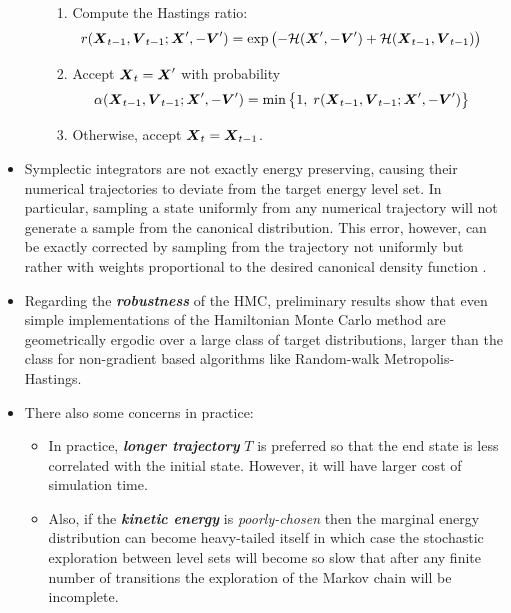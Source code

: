 \documentclass[11pt]{article}
\begin{document}
\begin{itemize}
\begin{enumerate}
\begin{enumerate}
\item Compute the Hastings ratio:
\begin{align*}
r(\boldsymbol{X}_{t-1}, \boldsymbol{V}_{t-1}; \boldsymbol{X}', -\boldsymbol{V}') &= \exp\left(-{\mathcal H}(\boldsymbol{X}', -\boldsymbol{V}') + {\mathcal H}(\boldsymbol{X}_{t-1}, \boldsymbol{V}_{t-1})\right)
\end{align*}

\item Accept $\boldsymbol{X}_{t} = \boldsymbol{X}'$ with probability 
\begin{align*}
\alpha(\boldsymbol{X}_{t-1}, \boldsymbol{V}_{t-1}; \boldsymbol{X}', -\boldsymbol{V}') &= \min\left\{1,\;r(\boldsymbol{X}_{t-1}, \boldsymbol{V}_{t-1}; \boldsymbol{X}', -\boldsymbol{V}')\right\}
\end{align*}

\item Otherwise, accept $\boldsymbol{X}_{t} = \boldsymbol{X}_{t-1}$.
\end{enumerate}
\end{enumerate}

\item Symplectic integrators are not exactly energy preserving, causing their numerical trajectories to deviate from the target energy level set. In particular, sampling a state uniformly from any numerical trajectory will not generate a sample from the canonical distribution. This error, however, can be exactly corrected by sampling from the trajectory not uniformly but rather with weights proportional to the desired canonical density function \citep{betancourt2017conceptual}.

\item Regarding the \emph{\textbf{robustness}} of the HMC, preliminary results show that even simple implementations of the Hamiltonian Monte Carlo method are geometrically ergodic over a large class of target distributions, larger than the class for non-gradient based algorithms like Random-walk Metropolis-Hastings.

\item There also some concerns in practice:
\begin{itemize}
\item In practice, \emph{\textbf{longer trajectory}} $T$ is preferred so that the end state is less correlated with the initial state. However, it will have larger cost of simulation time.

\item Also, if the \emph{\textbf{kinetic energy}} is \emph{poorly-chosen} then the marginal energy distribution can become heavy-tailed itself in which case the stochastic exploration between level sets will become so slow that after any finite number of transitions the exploration of the Markov chain will be incomplete.


\end{itemize}
\end{itemize}
\end{document}
